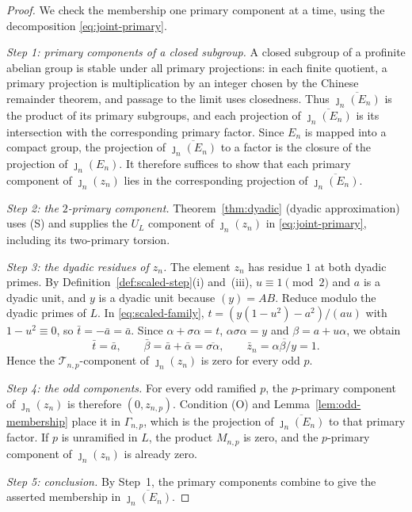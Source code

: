 \documentclass[11pt]{article}
\theoremstyle{plain}
\theoremstyle{definition}
\theoremstyle{remark}
\begin{document}
\begin{proof}
We check the membership one primary component at a time, using the
decomposition \eqref{eq:joint-primary}.

\emph{Step 1: primary components of a closed subgroup.}  A closed
subgroup of a profinite abelian group is stable under all primary
projections: in each finite quotient, a primary projection is
multiplication by an integer chosen by the Chinese remainder theorem, and
passage to the limit uses closedness.  Thus $\overline{\jmath_n(E_n)}$ is
the product of its primary subgroups, and each projection of
$\overline{\jmath_n(E_n)}$ is its intersection with the corresponding
primary factor.  Since $E_n$ is mapped into a compact group, the
projection of $\overline{\jmath_n(E_n)}$ to a factor is the closure of the
projection of $\jmath_n(E_n)$.  It therefore suffices to show that each
primary component of $\jmath_n(z_n)$ lies in the corresponding projection
of $\overline{\jmath_n(E_n)}$.

\emph{Step 2: the $2$-primary component.}  Theorem~\ref{thm:dyadic}
(dyadic approximation) uses (S) and supplies the $U_L$ component of
$\jmath_n(z_n)$ in \eqref{eq:joint-primary}, including its two-primary
torsion.

\emph{Step 3: the dyadic residues of $z_n$.}  The element $z_n$ has
residue $1$ at both dyadic primes.  By Definition~\ref{def:scaled-step}(i)
and~(iii), $u\equiv1\pmod2$ and $a$ is a dyadic unit, and $y$ is a dyadic
unit because $(y)=AB$.  Reduce modulo the dyadic primes of $L$.  In
\eqref{eq:scaled-family}, $t=(y(1-u^2)-a^2)/(au)$ with $1-u^2\equiv0$,
so $\bar t=-\bar a=\bar a$.  Since $\alpha+\sigma\alpha=t$,
$\alpha\sigma\alpha=y$ and $\beta=a+u\alpha$, we obtain
\[
 \bar t=\bar a,\qquad
 \bar\beta=\bar a+\bar\alpha=\overline{\sigma\alpha},
 \qquad \bar z_n=\overline{\alpha\beta/y}=1.
\]
Hence the $\mathcal T_{n,p}$-component of $\jmath_n(z_n)$ is zero for
every odd $p$.

\emph{Step 4: the odd components.}  For every odd ramified $p$, the
$p$-primary component of $\jmath_n(z_n)$ is therefore $(0,z_{n,p})$.
Condition (O) and Lemma~\ref{lem:odd-membership} place it in
$\Gamma_{n,p}$, which is the projection of $\overline{\jmath_n(E_n)}$ to
that primary factor.  If $p$ is unramified in $L$, the product $M_{n,p}$ is
zero, and the $p$-primary component of $\jmath_n(z_n)$ is already zero.

\emph{Step 5: conclusion.}  By Step~1, the primary components combine to
give the asserted membership in $\overline{\jmath_n(E_n)}$.
\end{proof}
\end{document}
